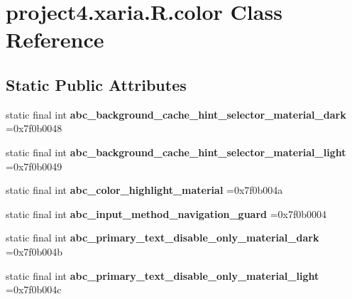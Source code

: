 \hypertarget{classproject4_1_1xaria_1_1R_1_1color}{}\section{project4.\+xaria.\+R.\+color Class Reference}
\label{classproject4_1_1xaria_1_1R_1_1color}
\subsection*{Static Public Attributes}
\begin{DoxyCompactItemize}
\item 
\mbox{\label{classproject4_1_1xaria_1_1R_1_1color_aef20a689023f06682119ea968194eafb}} 
static final int {\bfseries abc\+\_\+background\+\_\+cache\+\_\+hint\+\_\+selector\+\_\+material\+\_\+dark} =0x7f0b0048
\item 
\mbox{\label{classproject4_1_1xaria_1_1R_1_1color_a9ce38bcd1fdcc86d8167e0dee57496e2}} 
static final int {\bfseries abc\+\_\+background\+\_\+cache\+\_\+hint\+\_\+selector\+\_\+material\+\_\+light} =0x7f0b0049
\item 
\mbox{\label{classproject4_1_1xaria_1_1R_1_1color_ae877249bfc27f24fde22ad8c981a61fd}} 
static final int {\bfseries abc\+\_\+color\+\_\+highlight\+\_\+material} =0x7f0b004a
\item 
\mbox{\label{classproject4_1_1xaria_1_1R_1_1color_ad3d6b909276cc9f60a26a4afad52f39c}} 
static final int {\bfseries abc\+\_\+input\+\_\+method\+\_\+navigation\+\_\+guard} =0x7f0b0004
\item 
\mbox{\label{classproject4_1_1xaria_1_1R_1_1color_a0a7d7cd158676b86e14615725f8965a6}} 
static final int {\bfseries abc\+\_\+primary\+\_\+text\+\_\+disable\+\_\+only\+\_\+material\+\_\+dark} =0x7f0b004b
\item 
\mbox{\label{classproject4_1_1xaria_1_1R_1_1color_a0cfdd8229b4b660d266cccde30763d93}} 
static final int {\bfseries abc\+\_\+primary\+\_\+text\+\_\+disable\+\_\+only\+\_\+material\+\_\+light} =0x7f0b004c

\end{DoxyCompactItemize}
